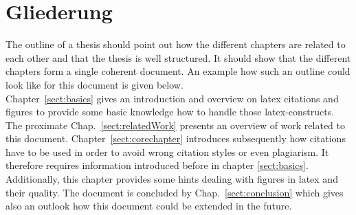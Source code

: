 \section{Gliederung}


The outline of a thesis should point out how the different chapters are related to each other and that the thesis is well structured.
It should show that the different chapters form a single coherent document.
An example how such an outline could look like for this document is given below.\\

Chapter~\ref{sect:basics} gives an introduction and overview on latex citations and figures to provide some basic knowledge how to handle those latex-constructs.
The proximate Chap.~\ref{sect:relatedWork} presents an overview of work related to this document.
Chapter~\ref{sect:corechapter} introduces subsequently how citations have to be used in order to avoid wrong citation styles or even plagiarism.
It therefore requires information introduced before in chapter \ref{sect:basics}.
Additionally, this chapter provides some hints dealing with figures in latex and their quality.
The document is concluded by Chap.~\ref{sect:conclusion} which gives also an outlook how this document could be extended in the future.
